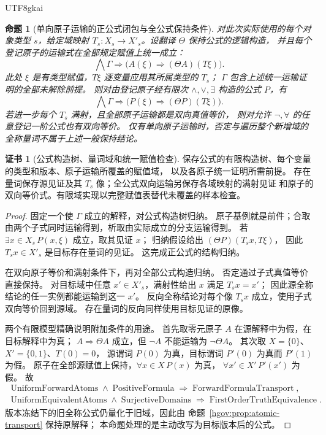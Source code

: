 \documentclass[12pt,a4paper,openany,notitlepage]{report}
\theoremstyle{plain}
\newtheorem{proposition}[theorem]{命题}
\theoremstyle{definition}
\newtheorem*{certificate}{证书}
\theoremstyle{remark}
\begin{document}
\begin{CJK*}{UTF8}{gkai}
\begin{proposition}[单向原子运输的正公式闭包与全公式保持条件]
\label{exp:gov:formula-transport}
对此次实际使用的每个对象类型 $s$，给定域映射
$T_s:X_s\to X'_s$。设翻译 $\Theta$ 保持公式的逻辑构造，
并且每个登记原子的运输式在全部规定赋值上统一成立：
\[
 \bigwedge\Gamma\Rightarrow
 \bigl(A(\xi)\Rightarrow(\Theta A)(T\xi)\bigr).
\]
此处 $\xi$ 是有类型赋值，$T\xi$ 逐变量应用其所属类型的 $T_s$；
$\Gamma$ 包含上述统一运输证明的全部未解除前提。
则对由登记原子经有限次 $\land,\lor,\exists$ 构造的公式 $P$，有
\[
 \bigwedge\Gamma\Rightarrow
 \bigl(P(\xi)\Rightarrow(\Theta P)(T\xi)\bigr).
\]
若进一步每个 $T_s$ 满射，且全部原子运输都是双向真值等价，
则对允许 $\neg,\forall$ 的任意登记一阶公式也有双向等价。
仅有单向原子运输时，否定与遍历整个新增域的全称量词不属于上述一般保持结论。
\end{proposition}
\begin{certificate}[公式构造树、量词域和统一赋值检查]
保存公式的有限构造树、每个变量的类型和版本、原子运输所覆盖的赋值域，
以及各原子统一证明所需前提。
存在量词保存源见证及其 $T_s$ 像；全公式双向运输另保存各域映射的满射见证
和原子的双向等价式。有限域实现以完整赋值表替代未覆盖的样本检查。
\end{certificate}
\begin{proof}
固定一个使 $\Gamma$ 成立的解释，对公式构造树归纳。
原子基例就是前件；合取由两个子式同时运输得到，析取由实际成立的分支运输得到。
若 $\exists x\in X_s\,P(x,\xi)$ 成立，取其见证 $x$；
归纳假设给出 $(\Theta P)(T_sx,T\xi)$，
因此 $T_sx\in X'_s$ 是目标存在量词的见证。
这完成正公式的结构归纳。

在双向原子等价和满射条件下，再对全部公式构造归纳。
否定通过子式真值等价直接保持。
对目标域中任意 $x'\in X'_s$，满射性给出 $x$ 满足 $T_sx=x'$；
因此源全称结论的任一实例都能运输到这一 $x'$。
反向全称结论对每个像 $T_sx$ 成立，使用子式双向等价回到源域。
存在量词的反向同样使用目标见证的原像。

两个有限模型精确说明附加条件的用途。
首先取零元原子 $A$ 在源解释中为假，在目标解释中为真；
$A\Rightarrow\Theta A$ 成立，但 $\neg A$ 不能运输为 $\neg\Theta A$。
其次取 $X=\{0\}$、$X'=\{0,1\}$、$T(0)=0$，
源谓词 $P(0)$ 为真，目标谓词 $P'(0)$ 为真而 $P'(1)$ 为假。
原子在全部源赋值上保持，$\forall x\in X\,P(x)$ 为真，
$\forall x'\in X'\,P'(x')$ 为假。
故
\[
\begin{gathered}
 \operatorname{UniformForwardAtoms}\land\operatorname{PositiveFormula}
 \Rightarrow\operatorname{ForwardFormulaTransport},\\
 \operatorname{UniformEquivalentAtoms}\land\operatorname{SurjectiveDomains}
 \Rightarrow\operatorname{FirstOrderTruthEquivalence}.
\end{gathered}
\]
版本冻结下的旧全称公式仍量化于旧域，因此由
命题~\ref{hgov:prop:atomic-transport} 保持原解释；
本命题处理的是主动改写为目标版本后的公式。
\end{proof}


\end{CJK*}
\end{document}
